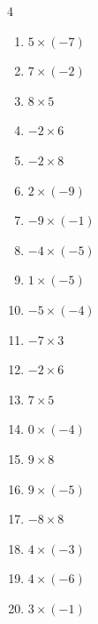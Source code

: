 \begin{multicols}{4}
\begin{enumerate}
\columnbreak %

  \item $5\times (-7)$
        \phantom{$=-35$}

  \item $7\times (-2)$
        \phantom{$=-14$}

  \item $8\times 5$
        \phantom{$=40$}

  \item $-2\times 6$
        \phantom{$=-12$}

  \item $-2\times 8$
        \phantom{$=-16$}

  \item $2\times (-9)$
        \phantom{$=-18$}

  \item $-9\times (-1)$
        \phantom{$=9$}

  \item $-4\times (-5)$
        \phantom{$=20$}

  \item $1\times (-5)$
        \phantom{$=-5$}

  \item $-5\times (-4)$
        \phantom{$=20$}

  \item $-7\times 3$
        \phantom{$=-21$}

  \item $-2\times 6$
        \phantom{$=-12$}

  \item $7\times 5$
        \phantom{$=35$}

  \item $0\times (-4)$
        \phantom{$=0$}

  \item $9\times 8$
        \phantom{$=72$}

  \item $9\times (-5)$
        \phantom{$=-45$}

  \item $-8\times 8$
        \phantom{$=-64$}

  \item $4\times (-3)$
        \phantom{$=-12$}

  \item $4\times (-6)$
        \phantom{$=-24$}

  \item $3\times (-1)$
        \phantom{$=-3$}


\end{enumerate}
\end{multicols}
